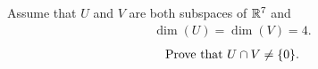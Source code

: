 \begin{question}
	\normalfont
	
	Assume that $U$ and $V$ are both subspaces of ${\mathbb R}^7$ and 
	\begin{align*}
		\dim(U)=\dim(V)=4.
	\end{align*} 
	\begin{align}\label{eq:UIntersectVStatement}
		\text{Prove that}\  U\cap V \not= \{0\}. 
	\end{align}
\end{question}